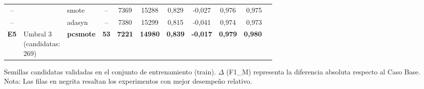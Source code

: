 \documentclass{article}
\begin{document}
\begin{table}[ht]
\begin{minipage}{0.95\textwidth}
\begin{tabular}{cllccccccrc}
            -- & & smote & -- & 7369 & 15288 & 0,829 & -0,027 & 0,976 & 0,975 \\
            -- & & adasyn & -- & 7380 & 15299 & 0,815 & -0,041 & 0,974 & 0,973 \\
            \midrule
            \textbf{E5} & \shortstack{Umbral 3 \\ (candidatas: \\ 269)} & \textbf{pcsmote} & \textbf{53} & \textbf{7221} & \textbf{14980} & \textbf{0,839} & \textbf{-0,017} & \textbf{0,979} & \textbf{0,980} \\
            \bottomrule
        \end{tabular}
        \vspace{1mm}
        \begin{flushleft}
            \footnotesize * Semillas candidatas validadas en el conjunto de entrenamiento (train). $\Delta$ (F1\_M) representa la diferencia absoluta respecto al Caso Base. Nota: Las filas en negrita resaltan los experimentos con mejor desempeño relativo.
        \end{flushleft}
    \end{minipage}
\end{table}
\end{document}
